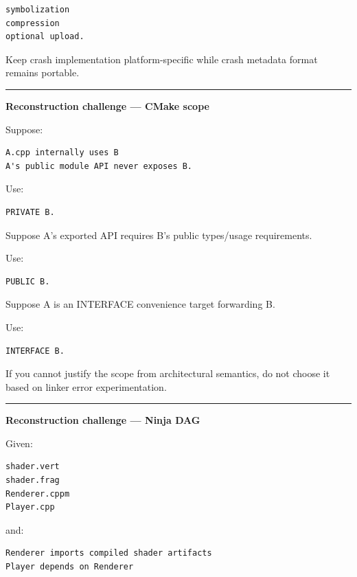 \begin{verbatim}
symbolization
compression
optional upload.
\end{verbatim}

Keep crash implementation platform-specific while crash metadata format remains portable.

\begin{center}\rule{0.5\linewidth}{0.5pt}\end{center}

\textbf{Reconstruction challenge --- CMake scope}

Suppose:

\begin{verbatim}
A.cpp internally uses B
A's public module API never exposes B.
\end{verbatim}

Use:

\begin{verbatim}
PRIVATE B.
\end{verbatim}

Suppose A's exported API requires B's public types/usage requirements.

Use:

\begin{verbatim}
PUBLIC B.
\end{verbatim}

Suppose A is an INTERFACE convenience target forwarding B.

Use:

\begin{verbatim}
INTERFACE B.
\end{verbatim}

If you cannot justify the scope from architectural semantics, do not choose it based on linker error experimentation.

\begin{center}\rule{0.5\linewidth}{0.5pt}\end{center}

\textbf{Reconstruction challenge --- Ninja DAG}

Given:

\begin{verbatim}
shader.vert
shader.frag
Renderer.cppm
Player.cpp
\end{verbatim}

and:

\begin{verbatim}
Renderer imports compiled shader artifacts
Player depends on Renderer
\end{verbatim}

